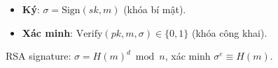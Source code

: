 \documentclass[12pt,a4paper]{article}
\begin{document}
\begin{dinhnghia}[title={Chữ ký số}]
  \begin{itemize}
    \item \textbf{Ký}: $\sigma = \text{Sign}(sk, m)$ (khóa bí mật).
    \item \textbf{Xác minh}: $\text{Verify}(pk, m, \sigma) \in \{0, 1\}$ (khóa công khai).
  \end{itemize}
  RSA signature: $\sigma = H(m)^d \bmod n$, xác minh $\sigma^e \equiv H(m)$.
\end{dinhnghia}
\end{document}
